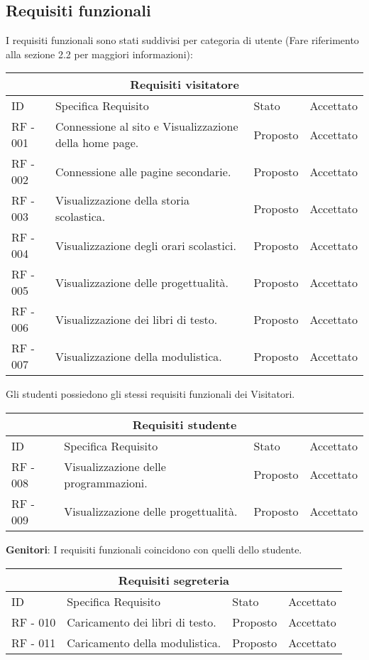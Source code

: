 \documentclass{article}
\begin{document}
\subsection{\textbf{Requisiti funzionali}}
\normalsize
\flushleft
I requisiti funzionali sono stati suddivisi per categoria di utente (Fare riferimento alla sezione 2.2 per maggiori informazioni):
	\begin{tabular}{ |p{1cm}|p{4cm}|p{3cm}|p{2cm}|  }
		\hline
		\multicolumn{4}{|c|}{Requisiti visitatore} \\
		\hline
		ID& Specifica Requisito &Stato&Accettato\\
		\hline
		RF - 001& Connessione al sito e Visualizzazione della home page. &Proposto&Accettato\\
		\hline
		RF - 002& Connessione alle pagine secondarie. &Proposto&Accettato\\
		\hline
		RF - 003& Visualizzazione della storia scolastica. &Proposto&Accettato\\
		\hline
		RF - 004& Visualizzazione degli orari scolastici. &Proposto&Accettato\\
		\hline
		RF - 005& Visualizzazione delle progettualità. &Proposto&Accettato\\
		\hline
		RF - 006& Visualizzazione dei libri di testo. &Proposto&Accettato\\
		\hline
		RF - 007& Visualizzazione della modulistica. &Proposto&Accettato\\
		\hline
	\end{tabular}
	\vspace{2mm}
    Gli studenti possiedono gli stessi requisiti funzionali dei Visitatori.\\
	\begin{tabular}{ |p{1cm}|p{4cm}|p{3cm}|p{2cm}|  }
		\hline
		\multicolumn{4}{|c|}{Requisiti studente} \\
		\hline
		ID& Specifica Requisito &Stato&Accettato\\
		\hline
		RF - 008& Visualizzazione delle programmazioni. &Proposto&Accettato\\
		\hline
		RF - 009& Visualizzazione delle progettualità. &Proposto&Accettato\\
		\hline
	\end{tabular}	
	\vspace{2mm}
	\textbf{Genitori}: I requisiti funzionali coincidono con quelli dello studente.
	\begin{tabular}{ |p{1cm}|p{4cm}|p{3cm}|p{2cm}|  }
		\hline
		\multicolumn{4}{|c|}{Requisiti segreteria} \\
		\hline
		ID& Specifica Requisito &Stato&Accettato\\
		\hline
		RF - 010& Caricamento dei libri di testo. &Proposto&Accettato\\
		\hline
		RF - 011& Caricamento della modulistica. &Proposto&Accettato\\
		\hline
	\end{tabular}
\end{document}
